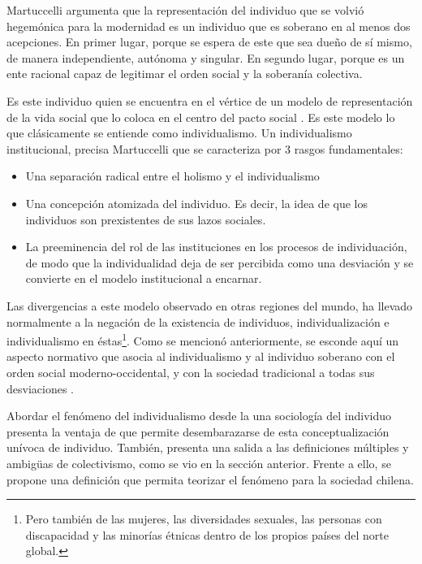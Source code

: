 \documentclass[12pt,twoside]{templates/facsothesis}
\providecommand{\tightlist}{%
  \setlength{\itemsep}{0pt}\setlength{\parskip}{0pt}}
\begin{document}
Martuccelli \citeyearpar{martuccelli2010} argumenta que la representación del individuo que se volvió hegemónica para la modernidad es un individuo que es soberano en al menos dos acepciones. En primer lugar, porque se espera de este que sea dueño de sí mismo, de manera independiente, autónoma y singular. En segundo lugar, porque es un ente racional capaz de legitimar el orden social y la soberanía colectiva.

Es este individuo quien se encuentra en el vértice de un modelo de representación de la vida social que lo coloca en el centro del pacto social \citep{martuccelli2010, martuccelli2018}. Es este modelo lo que clásicamente se entiende como individualismo. Un individualismo institucional, precisa Martuccelli \citeyearpar{martuccelli2018} que se caracteriza por 3 rasgos fundamentales:

\begin{itemize}
\tightlist
\item
  Una separación radical entre el holismo y el individualismo
\item
  Una concepción atomizada del individuo. Es decir, la idea de que los individuos son prexistentes de sus lazos sociales.
\item
  La preeminencia del rol de las instituciones en los procesos de individuación, de modo que la individualidad deja de ser percibida como una desviación y se convierte en el modelo institucional a encarnar.
\end{itemize}

Las divergencias a este modelo observado en otras regiones del mundo, ha llevado normalmente a la negación de la existencia de individuos, individualización e individualismo en éstas\footnote{Pero también de las mujeres, las diversidades sexuales, las personas con discapacidad y las minorías étnicas dentro de los propios países del norte global.}. Como se mencionó anteriormente, se esconde aquí un aspecto normativo que asocia al individualismo y al individuo soberano con el orden social moderno-occidental, y con la sociedad tradicional a todas sus desviaciones \citep{martuccelli2018}.

Abordar el fenómeno del individualismo desde la una sociología del individuo presenta la ventaja de que permite desembarazarse de esta conceptualización unívoca de individuo. También, presenta una salida a las definiciones múltiples y ambigüas de colectivismo, como se vio en la sección anterior. Frente a ello, se propone una definición que permita teorizar el fenómeno para la sociedad chilena.
\end{document}
